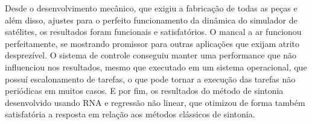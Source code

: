 Desde o desenvolvimento mecânico, que exigiu a fabricação de todas as peças e além disso, ajustes para o perfeito funcionamento da dinâmica do simulador de satélites, os resultados foram funcionais e satisfatórios. O mancal a ar funcionou perfeitamente, se mostrando promissor para outras aplicações que exijam atrito desprezível. O sistema de controle conseguiu manter uma performance que não influenciou nos resultados, mesmo que executado em um sistema operacional, que possuí escalonamento de tarefas, o que pode tornar a execução das tarefas não periódicas em muitos casos. E por fim, os resultados do método de sintonia desenvolvido usando RNA e regressão não linear, que otimizou de forma também satisfatória a resposta em relação aos métodos clássicos de sintonia.
